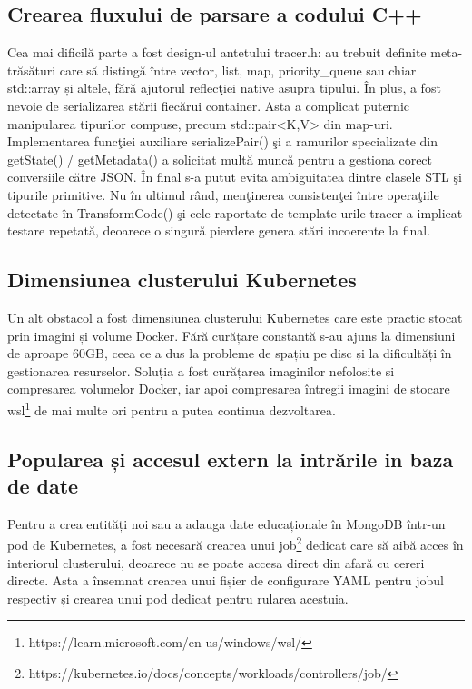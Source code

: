 \subsection{Crearea fluxului de parsare a codului C++}

Cea mai dificilă parte a fost design-ul antetului tracer.h: au trebuit definite
meta-trăsături care să distingă între vector,  list,
map, priority_queue sau chiar std::array și altele, fără ajutorul
reflecţiei native asupra tipului. În plus, a fost nevoie de serializarea stării fiecărui 
container. Asta a complicat puternic manipularea tipurilor compuse, precum 
std::pair<K,V> din map-uri. Implementarea funcţiei auxiliare
serializePair() şi a ramurilor specializate din getState()
/ getMetadata() a solicitat multă muncă pentru a gestiona corect
conversiile către JSON. În final s-a putut evita ambiguitatea dintre clasele STL şi tipurile
primitive. Nu în ultimul rând, menţinerea consistenţei între operaţiile detectate
în TransformCode() şi cele raportate de template-urile tracer a
implicat testare repetată, deoarece o singură pierdere genera stări incoerente la final.

\subsection{Dimensiunea clusterului Kubernetes}

Un alt obstacol a fost dimensiunea clusterului Kubernetes care este practic stocat 
prin imagini și volume Docker. Fără curățare constantă s-au ajuns la dimensiuni de aproape
60GB, ceea ce a dus la probleme de spațiu pe disc și la dificultăți în gestionarea
resurselor. Soluția a fost curățarea imaginilor nefolosite și compresarea volumelor Docker, iar
apoi compresarea întregii imagini de stocare wsl\footnote{https://learn.microsoft.com/en-us/windows/wsl/}
de mai multe ori pentru a putea continua dezvoltarea.

\subsection{Popularea și accesul extern la intrările in baza de date}
Pentru a crea entități noi sau a adauga date educaționale în MongoDB într-un pod
de Kubernetes, a fost necesară crearea unui job\footnote{https://kubernetes.io/docs/concepts/workloads/controllers/job/}
dedicat care să aibă acces în interiorul
clusterului, deoarece nu se poate accesa direct din afară cu cereri
directe. Asta a însemnat crearea unui fișier de configurare YAML pentru jobul respectiv și 
crearea unui pod dedicat pentru rularea acestuia.


